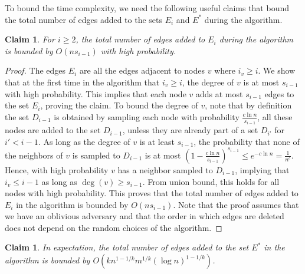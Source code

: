 \documentclass[11pt]{article}
\newtheorem{claim}[theorem]{Claim}
\theoremstyle{definition}
\theoremstyle{remark}
\begin{document}
To bound the time complexity, we need the following useful claims that bound the total number of edges added to the sets $E_i$ and $E^*$ during the algorithm.

\begin{claim}\label{claim_Ei}
For $i \geq 2$, the total number of edges added to $E_i$ during the algorithm is bounded by $O(ns_{i-1})$ with high probability.
\end{claim}

\begin{proof}
The edges $E_i$ are all the edges adjacent to nodes $v$ where $i_v \geq i$. We show that at the first time in the algorithm that $i_v \geq i$, the degree of $v$ is at most $s_{i-1}$ with high probability. This implies that each node $v$ adds at most $s_{i-1}$ edges to the set $E_i$, proving the claim. 
To bound the degree of $v$, note that by definition the set $D_{i-1}$ is obtained by sampling each node with probability $\frac{c \ln{n}}{s_{i-1}}$, all these nodes are added to the set $D_{i-1}$, unless they are already part of a set $D_{i'}$ for $i' < i-1$. As long as the degree of $v$ is at least $s_{i-1}$, the probability that none of the neighbors of $v$ is sampled to $D_{i-1}$ is at most $(1-\frac{c\ln{n}}{s_{i-1}})^{s_{i-1}} \leq e^{-c\ln{n}}=\frac{1}{n^c}$. Hence, with high probability $v$ has a neighbor sampled to $D_{i-1}$, implying that $i_v \leq i-1$ as long as $\deg(v) \geq s_{i-1}$. From union bound, this holds for all nodes with high probability. This proves that the total number of edges added to $E_i$ in the algorithm is bounded by $O(ns_{i-1})$. Note that the proof assumes that we have an oblivious adversary and that the order in which edges are deleted does not depend on the random choices of the algorithm.
\end{proof}

\begin{claim}\label{claim_E*}
In expectation, the total number of edges added to the set $E^*$ in the algorithm is bounded by $O(kn^{1-1/k}m^{1/k}(\log{n})^{1-1/k})$.
\end{claim}
\end{document}
